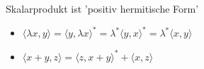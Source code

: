 \begin{Bem}
	Skalarprodukt ist 'positiv hermitische Form'
	\begin{itemize}
		\item $\langle \lambda x,y\rangle = \langle y,\lambda x\rangle^\ast = \lambda^\ast \langle y, x\rangle^\ast=
				\lambda^\ast \langle x,y\rangle$
		\item $\langle x+y,z\rangle = \langle z,x+y\rangle^\ast + \langle x,z\rangle$
	\end{itemize}
\end{Bem}
















